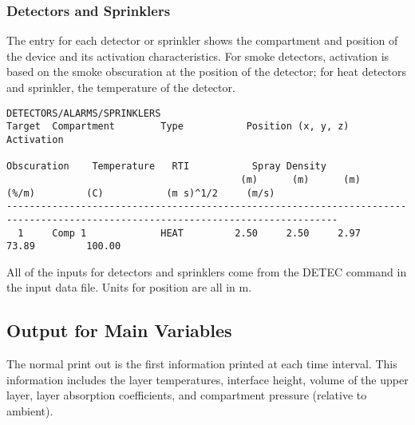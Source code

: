 \subsubsection{Detectors and Sprinklers}

The entry for each detector or sprinkler shows the compartment and position of the device and its activation characteristics. For smoke detectors, activation is based on the smoke obscuration at the position of the detector; for heat detectors and sprinkler, the temperature of the detector.


\begin{lstlisting}[basicstyle=\tiny]
DETECTORS/ALARMS/SPRINKLERS
Target  Compartment        Type           Position (x, y, z)            Activation
                                                                        Obscuration    Temperature   RTI           Spray Density
                                         (m)      (m)      (m)          (%/m)         (C)           (m s)^1/2     (m/s)
--------------------------------------------------------------------------------------------------------------------------------
  1     Comp 1             HEAT         2.50     2.50     2.97                         73.89         100.00
\end{lstlisting}
All of the inputs for detectors and sprinklers come from the DETEC command in the input data file. Units for position are all in m.

\subsection{Output for Main Variables}

The normal print out is the first information printed at each time interval.  This information includes the layer temperatures, interface height, volume of the upper layer, layer absorption coefficients, and compartment pressure (relative to ambient).

